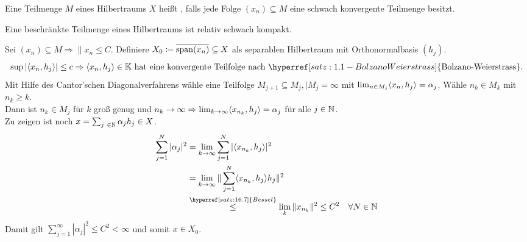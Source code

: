 \begin{definition}
	Eine Teilmenge $M$ eines Hilbertraums $X$ hei{\ss}t , falls jede Folge $(x_{n}) \subseteq M$ eine schwach konvergente Teilmenge besitzt.
\end{definition}


\begin{satz}
	Eine beschränkte Teilmenge eines Hilbertraums ist relativ schwach kompakt.	
\end{satz}

\begin{beweis}
	Sei $(x_{n}) \subseteq M \Rightarrow \| x_{n} \leq C$. Definiere $X_{0} \coloneqq \overline{\operatorname{span}(x_{n})} \subseteq X$ als separablen Hilbertraum mit Orthonormalbasis $(h_{j})$.	
		\[ \sup | \< x_{n} , h_{j} \> | \leq c \Rightarrow \< x_{n} , h_{j} \> \in \MdK \text{ hat eine konvergente Teilfolge nach } \hyperref[satz:1.1-BolzanoWeierstrass]{\text{Bolzano-Weierstrass}}. \]
		Mit Hilfe des Cantor'schen Diagonalverfahrens wähle eine Teilfolge $M_{j+1} \subseteq M_{j}, |M_{j} = \infty$ mit $\lim_{n \in M_{j}} \langle x_{n} , h_{j} \rangle = \alpha_{j}$. Wähle $n_{k} \in M_{k}$ mit $n_{k} \geq k$. \\
		Dann ist $n_{k} \in M_{j}$ für $k$ gro{\ss} genug und $n_{k} \rightarrow \infty \Rightarrow \lim_{k \rightarrow \infty} \langle x_{n_{k}} , h_{j} \rangle = \alpha_{j}$ für alle $j \in \mathbb{N}$. \\
		Zu zeigen ist noch $x = \sum_{j \in \MdN} \alpha_{j} h_{j} \in X$.
		\begin{align*}
			\sum_{j = 1}^{N} | \alpha_{j} |^{2} & = \lim_{k \rightarrow \infty} \sum_{j = 1}^{N} | \< x_{n_{k}} , h_{j} \> |^{2} \\
				& = \lim_{k \rightarrow \infty} \| \sum_{j = 1}^{N} \< x_{n_{k}} , h_{j} \> h_{j} \|^{2} \\
				& \overset{\hyperref[satz:16.7]{Bessel}}{\leq} \lim_{k} \| x_{n_{k}} \|^{2} \leq C^{2} \quad \forall N \in \MdN
		\end{align*}
		Damit gilt $\sum_{j = 1}^{\infty} | \alpha_{j} |^{2} \leq C^{2} < \infty$ und somit $x \in X_{0}$.
\end{beweis}



\newpage